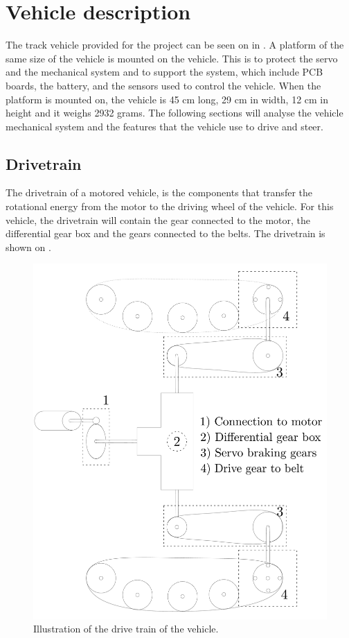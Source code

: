 \section{Vehicle description}
The track vehicle provided for the project can be seen on  in . A platform of the same size of the vehicle  is mounted on the vehicle. This is to protect the servo and the mechanical system and to support the system, which include PCB boards, the battery, and the sensors used to control the vehicle. When the platform is mounted on, the vehicle is 45 cm long, 29 cm in width, 12 cm in height and it weighs 2932 grams.
The following sections will analyse the vehicle mechanical system and the features that the vehicle use to drive and steer.

\subsection{Drivetrain}

The drivetrain of a motored vehicle, is the components that transfer the rotational energy from the motor to the driving wheel of the vehicle. For this vehicle, the drivetrain will contain the gear connected to the motor, the differential gear box and the gears connected to the belts. The drivetrain is shown on .

\begin{figure}[H]
	\centering
	\includegraphics[scale=0.2]{figures/vehicleDescriptionDriveTrain.pdf}
	\caption{Illustration of the drive train of the vehicle.}
	\label{vehicleDescriptionDriveTrain}
\end{figure}


